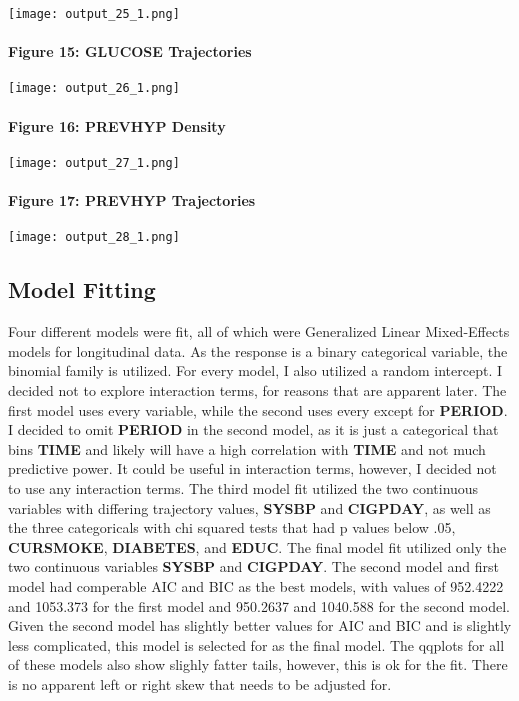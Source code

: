 \documentclass[11pt]{article}
\makeatletter
\def\maxwidth{\ifdim\Gin@nat@width>\linewidth\linewidth
    \else\Gin@nat@width\fi}
\let\Oldincludegraphics\includegraphics
\renewcommand{\includegraphics}[1]{\Oldincludegraphics[width=.8\maxwidth]{#1}}
\makeatother
\begin{document}
    \texttt{[image: output\_25\_1.png]}

    \hypertarget{figure-15-glucose-trajectories}{%
\paragraph{Figure 15: GLUCOSE
Trajectories}\label{figure-15-glucose-trajectories}}

    \texttt{[image: output\_26\_1.png]}

    \hypertarget{figure-16-prevhyp-density}{%
\paragraph{Figure 16: PREVHYP Density}\label{figure-16-prevhyp-density}}

    \texttt{[image: output\_27\_1.png]}

    \hypertarget{figure-17-prevhyp-trajectories}{%
\paragraph{Figure 17: PREVHYP
Trajectories}\label{figure-17-prevhyp-trajectories}}

    \texttt{[image: output\_28\_1.png]}

    \hypertarget{model-fitting}{%
\subsection{Model Fitting}\label{model-fitting}}

    Four different models were fit, all of which were Generalized Linear
Mixed-Effects models for longitudinal data. As the response is a binary
categorical variable, the binomial family is utilized. For every model,
I also utilized a random intercept. I decided not to explore interaction
terms, for reasons that are apparent later. The first model uses every
variable, while the second uses every except for \textbf{PERIOD}. I
decided to omit \textbf{PERIOD} in the second model, as it is just a
categorical that bins \textbf{TIME} and likely will have a high
correlation with \textbf{TIME} and not much predictive power. It could
be useful in interaction terms, however, I decided not to use any
interaction terms. The third model fit utilized the two continuous
variables with differing trajectory values, \textbf{SYSBP} and
\textbf{CIGPDAY}, as well as the three categoricals with chi squared
tests that had p values below .05, \textbf{CURSMOKE}, \textbf{DIABETES},
and \textbf{EDUC}. The final model fit utilized only the two continuous
variables \textbf{SYSBP} and \textbf{CIGPDAY}. The second model and
first model had comperable AIC and BIC as the best models, with values
of 952.4222 and 1053.373 for the first model and 950.2637 and 1040.588
for the second model. Given the second model has slightly better values
for AIC and BIC and is slightly less complicated, this model is selected
for as the final model. The qqplots for all of these models also show
slighly fatter tails, however, this is ok for the fit. There is no
apparent left or right skew that needs to be adjusted for.
\end{document}
